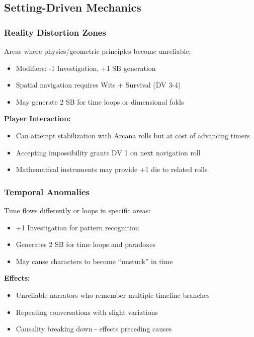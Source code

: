 \documentclass[11pt]{article}
\begin{document}
\subsection{Setting-Driven Mechanics}

\subsubsection{Reality Distortion Zones}

Areas where physics/geometric principles become unreliable:
\begin{itemize}
\item Modifiers: -1 Investigation, +1 SB generation
\item Spatial navigation requires Wits + Survival (DV 3-4)
\item May generate 2 SB for time loops or dimensional folds
\end{itemize}

\textbf{Player Interaction:}
\begin{itemize}
\item Can attempt stabilization with Arcana rolls but at cost of advancing timers
\item Accepting impossibility grants DV 1 on next navigation roll
\item Mathematical instruments may provide +1 die to related rolls
\end{itemize}

\subsubsection{Temporal Anomalies}

Time flows differently or loops in specific areas:
\begin{itemize}
\item +1 Investigation for pattern recognition
\item Generates 2 SB for time loops and paradoxes
\item May cause characters to become ``unstuck'' in time
\end{itemize}

\textbf{Effects:}
\begin{itemize}
\item Unreliable narrators who remember multiple timeline branches
\item Repeating conversations with slight variations
\item Causality breaking down - effects preceding causes
\end{itemize}
\end{document}
